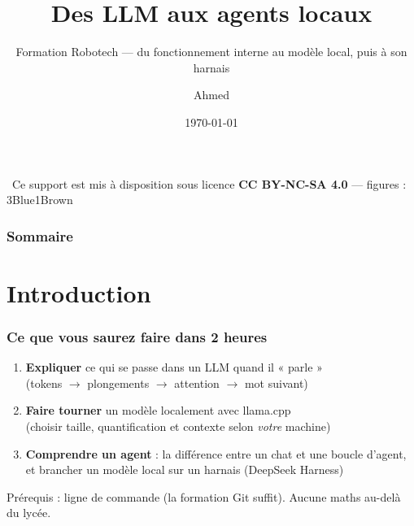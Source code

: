 \documentclass[
	11pt,
	aspectratio=169
]{beamer}
\title[Des LLM aux agents locaux]{Des LLM aux agents locaux}
\subtitle{Formation Robotech --- du fonctionnement interne au modèle local, puis à son harnais}
\author[Ahmed pour Robotech]{Ahmed}
\institute[Robotech]{\url{https://github.com/Robotech-Lillois}}
\date[\today \quad \ccbyncsa]{\today}
\begin{document}
\begin{frame}
    \titlepage
    \vspace{-0.6cm}
    \begin{center}
        \footnotesize
        \ccbyncsa\ Ce support est mis à disposition sous licence \textbf{CC BY-NC-SA 4.0} --- figures : 3Blue1Brown
    \end{center}
\end{frame}

\begin{frame}
    \frametitle{Sommaire}
    \tableofcontents
\end{frame}

\section{Introduction}

\begin{frame}
    \frametitle{Ce que vous saurez faire dans 2 heures}
    \begin{enumerate}
        \item \textbf{Expliquer} ce qui se passe dans un LLM quand il « parle » \\
        (tokens $\rightarrow$ plongements $\rightarrow$ attention $\rightarrow$ mot suivant)
        \item \textbf{Faire tourner} un modèle localement avec llama.cpp \\
        (choisir taille, quantification et contexte selon \emph{votre} machine)
        \item \textbf{Comprendre un agent} : la différence entre un chat et une boucle d'agent, et brancher un modèle local sur un harnais (DeepSeek Harness)
    \end{enumerate}
    \vspace{0.3cm}
    \begin{alertblock}{}
        Prérequis : ligne de commande (la formation Git suffit). Aucune maths au-delà du lycée.
    \end{alertblock}
\end{frame}
\end{document}
